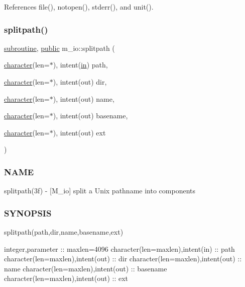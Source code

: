References file(), notopen(), stderr(), and unit().

\mbox{\label{namespacem__io_a7d1857c5c839bf3e096ce68fa1447d44}} 
\subsubsection{\texorpdfstring{splitpath()}{splitpath()}}
{\footnotesize\ttfamily \hyperlink{M__stopwatch_83_8txt_acfbcff50169d691ff02d4a123ed70482}{subroutine}, \hyperlink{M__stopwatch_83_8txt_a2f74811300c361e53b430611a7d1769f}{public} m\+\_\+io\+::splitpath (\begin{DoxyParamCaption}\item[{\hyperlink{option__stopwatch_83_8txt_abd4b21fbbd175834027b5224bfe97e66}{character}(len=$\ast$), intent(\hyperlink{M__journal_83_8txt_afce72651d1eed785a2132bee863b2f38}{in})}]{path,  }\item[{\hyperlink{option__stopwatch_83_8txt_abd4b21fbbd175834027b5224bfe97e66}{character}(len=$\ast$), intent(out)}]{dir,  }\item[{\hyperlink{option__stopwatch_83_8txt_abd4b21fbbd175834027b5224bfe97e66}{character}(len=$\ast$), intent(out)}]{name,  }\item[{\hyperlink{option__stopwatch_83_8txt_abd4b21fbbd175834027b5224bfe97e66}{character}(len=$\ast$), intent(out)}]{basename,  }\item[{\hyperlink{option__stopwatch_83_8txt_abd4b21fbbd175834027b5224bfe97e66}{character}(len=$\ast$), intent(out)}]{ext }\end{DoxyParamCaption})}



\subsubsection*{N\+A\+ME}

splitpath(3f) -\/ \mbox{[}M\+\_\+io\mbox{]} split a Unix pathname into components 

\subsubsection*{S\+Y\+N\+O\+P\+S\+IS}

splitpath(path,dir,name,basename,ext)

integer,parameter \+:\+: maxlen=4096 character(len=maxlen),intent(in) \+:\+: path character(len=maxlen),intent(out) \+:\+: dir character(len=maxlen),intent(out) \+:\+: name character(len=maxlen),intent(out) \+:\+: basename character(len=maxlen),intent(out) \+:\+: ext

